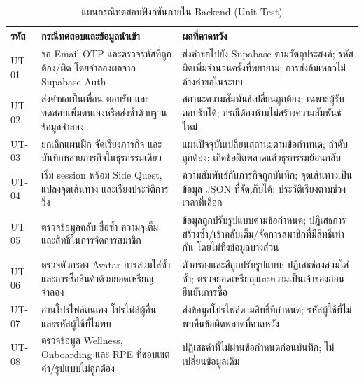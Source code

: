 \begin{table}[H]
\centering
\small
\caption{แผนกรณีทดสอบฟังก์ชันภายใน Backend (Unit Test)}
\label{tab:backend-unit-test-cases}
\renewcommand{\arraystretch}{1.2}
\begin{tabular}{|>{\raggedright\arraybackslash}p{}|>{\raggedright\arraybackslash}p{}|>{\raggedright\arraybackslash}p{}|}
\hline
\textbf{รหัส} & \textbf{กรณีทดสอบและข้อมูลนำเข้า} & \textbf{ผลที่คาดหวัง} \\ \hline
UT-01 & ขอ Email OTP และตรวจรหัสที่ถูกต้อง/ผิด โดยจำลองผลจาก Supabase Auth & ส่งคำขอไปยัง Supabase ตามวัตถุประสงค์; รหัสผิดเพิ่มจำนวนครั้งที่พยายาม; การส่งล้มเหลวไม่ค้างคำขอในระบบ \\ \hline
UT-02 & ส่งคำขอเป็นเพื่อน ตอบรับ และทดสอบเพิ่มตนเองหรือส่งซ้ำด้วยฐานข้อมูลจำลอง & สถานะความสัมพันธ์เปลี่ยนถูกต้อง; เฉพาะผู้รับตอบรับได้; กรณีต้องห้ามไม่สร้างความสัมพันธ์ใหม่ \\ \hline
UT-03 & ยกเลิกแผนฝึก จัดเรียงภารกิจ และบันทึกหลายภารกิจในธุรกรรมเดียว & แผนปัจจุบันเปลี่ยนสถานะตามข้อกำหนด; ลำดับถูกต้อง; เกิดข้อผิดพลาดแล้วธุรกรรมย้อนกลับ \\ \hline
UT-04 & เริ่ม session พร้อม Side Quest, แปลงจุดเส้นทาง และเรียงประวัติการวิ่ง & ความสัมพันธ์กับภารกิจถูกบันทึก; จุดเส้นทางเป็นข้อมูล JSON ที่จัดเก็บได้; ประวัติเรียงตามช่วงเวลาที่เลือก \\ \hline
UT-05 & ตรวจข้อมูลคลับ ชื่อซ้ำ ความจุเต็ม และสิทธิ์ในการจัดการสมาชิก & ข้อมูลถูกปรับรูปแบบตามข้อกำหนด; ปฏิเสธการสร้างซ้ำ/เข้าคลับเต็ม/จัดการสมาชิกที่มีสิทธิ์เท่ากัน โดยไม่ทิ้งข้อมูลบางส่วน \\ \hline
UT-06 & ตรวจตัวกรอง Avatar การสวมใส่ซ้ำ และการซื้อสินค้าด้วยยอดเหรียญจำลอง & ตัวกรองและสีถูกปรับรูปแบบ; ปฏิเสธช่องสวมใส่ซ้ำ; ตรวจยอดเหรียญและความเป็นเจ้าของก่อนยืนยันการซื้อ \\ \hline
UT-07 & อ่านโปรไฟล์ตนเอง โปรไฟล์ผู้อื่น และรหัสผู้ใช้ที่ไม่พบ & ส่งข้อมูลโปรไฟล์ตามสิทธิ์ที่กำหนด; รหัสผู้ใช้ที่ไม่พบคืนข้อผิดพลาดที่คาดหวัง \\ \hline
UT-08 & ตรวจข้อมูล Wellness, Onboarding และ RPE ที่ขอบเขตค่า/รูปแบบไม่ถูกต้อง & ปฏิเสธค่าที่ไม่ผ่านข้อกำหนดก่อนบันทึก; ไม่เปลี่ยนข้อมูลเดิม \\ \hline
\end{tabular}
\end{table}

